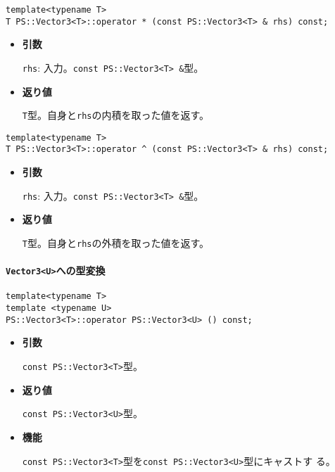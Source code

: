 \begin{screen}
\begin{verbatim}
template<typename T>
T PS::Vector3<T>::operator * (const PS::Vector3<T> & rhs) const;
\end{verbatim}
\end{screen}

\begin{itemize}

\item{{\bf 引数}}

{\tt rhs}: 入力。{\tt const PS::Vector3<T> \&}型。

\item{{\bf 返り値}}

{\tt T}型。自身と{\tt rhs}の内積を取った値を返す。

\end{itemize}

\begin{screen}
\begin{verbatim}
template<typename T>
T PS::Vector3<T>::operator ^ (const PS::Vector3<T> & rhs) const;
\end{verbatim}
\end{screen}

\begin{itemize}

\item{{\bf 引数}}

{\tt rhs}: 入力。{\tt const PS::Vector3<T> \&}型。

\item{{\bf 返り値}}

{\tt T}型。自身と{\tt rhs}の外積を取った値を返す。

\end{itemize}


\paragraph{{\tt Vector3<U>}への型変換}
\mbox{}

\begin{screen}
\begin{verbatim}
template<typename T>
template <typename U>
PS::Vector3<T>::operator PS::Vector3<U> () const;
\end{verbatim}
\end{screen}

\begin{itemize}

\item{{\bf 引数}}

{\tt const PS::Vector3<T>}型。

\item{{\bf 返り値}}

{\tt const PS::Vector3<U>}型。

\item{{\bf 機能}}

{\tt const PS::Vector3<T>}型を{\tt const PS::Vector3<U>}型にキャストす
る。

\end{itemize}
